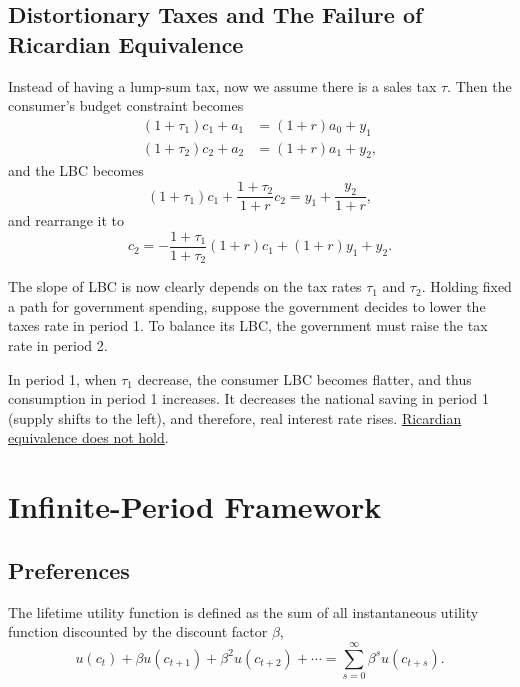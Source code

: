 \documentclass[10pt]{article}
\begin{document}
\subsection{Distortionary Taxes and The Failure of Ricardian Equivalence}

Instead of having a lump-sum tax, now we assume there is a sales tax $ \tau $. Then the consumer's
budget constraint becomes
\begin{align*}
(1 + \tau_1)c_1 + a_1 &= (1 + r)a_0 + y_1\\
(1 + \tau_2)c_2 + a_2 &= (1 + r)a_1 + y_2,
\end{align*}
and the LBC becomes
\begin{equation*}
(1 + \tau_1)c_1 + \frac{1 + \tau_2}{1 + r}c_{2} = y_1 + \frac{y_2}{1 + r},
\end{equation*}
and rearrange it to 
\begin{equation*}
c_2 =  - \frac{1 + \tau_1}{1 + \tau_2}(1 + r)c_1 + (1 + r)y_1 + y_2.
\end{equation*}

The slope of LBC is now clearly depends on the tax rates $ \tau_1 $ and $ \tau_2 $.
Holding fixed a path for government spending, suppose the government decides to lower the taxes rate
in period 1. To balance its LBC, the government must raise the tax rate in period 2.

In period 1, when $ \tau_1 $ decrease, the consumer LBC becomes flatter, and thus consumption in 
period 1 increases. It decreases the national saving in period 1 (supply shifts to the left), 
and therefore, real interest rate rises. {\underline {Ricardian equivalence does not hold}}.









\section{Infinite-Period Framework}
\subsection{Preferences}
The lifetime utility function is defined as the sum of all instantaneous utility function discounted
by the discount factor $ \beta $,
\begin{equation}
u(c_{t}) + \beta u(c_{t + 1}) + \beta^{2} u(c_{t + 2}) + \cdots =
\sum\limits_{s = 0} ^\infty 	\beta^{s}u(c_{t + s}).
\end{equation}
\end{document}
